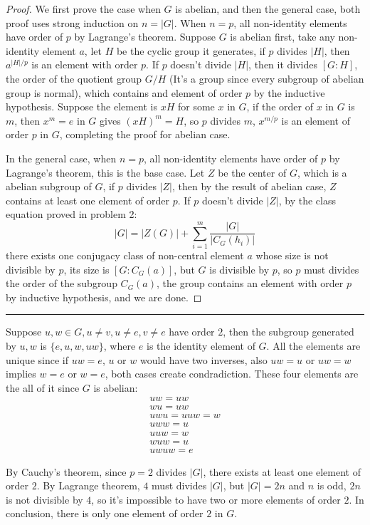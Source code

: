 \documentclass[12pt]{article}
\begin{document}
\begin{proof}
We first prove the case when $G$ is abelian, and then the general case, both proof uses strong induction on $n=|G|$. When $n=p$, all non-identity elements have order of $p$ by Lagrange's theorem. Suppose $G$ is abelian first, take any non-identity element $a$, let $H$ be the cyclic group it generates, if $p$ divides $|H|$, then $a^{|H|/p}$ is an element with order $p$. If $p$ doesn't divide $|H|$, then it divides $[G:H]$, the order of the quotient group $G/H$ (It's a group since every subgroup of abelian group is normal), which contains and element of order $p$ by the inductive hypothesis. Suppose the element is $xH$ for some $x$ in $G$, if the order of $x$ in $G$ is $m$, then $x^m=e$ in $G$ gives $(xH)^m=H$, so $p$ divides $m$, $x^{m/p}$ is an element of order $p$ in $G$, completing the proof for abelian case.

In the general case, when $n=p$, all non-identity elements have order of $p$ by Lagrange's theorem, this is the base case. Let $Z$ be the center of $G$, which is a abelian subgroup of $G$, if $p$ divides $|Z|$, then by the result of abelian case, $Z$ contains at least one element of order $p$. If $p$ doesn't divide $|Z|$, by the class equation proved in problem 2:
$$|G|=|Z(G)|+\displaystyle\sum^m_{i=1}\frac{|G|}{|C_G(h_i)|}$$
there exists one conjugacy class of non-central element $a$ whose size is not divisible by $p$, its size is $[G:C_G(a)]$, but $G$ is divisible by $p$, so $p$ must divides the order of the subgroup $C_G(a)$, the group contains an element with order $p$ by inductive hypothesis, and we are done.
\end{proof}

\noindent\rule{\textwidth}{1pt}

Suppose $u,w\in G,u\ne v,u\ne e,v\ne e$ have order $2$, then the subgroup generated by $u,w$ is $\{e,u,w,uw\}$, where $e$ is the identity element of $G$. All the elements are unique since if $uw=e$, $u$ or $w$ would have two inverses, also $uw=u$ or $uw=w$ implies $w=e$ or $w=e$, both cases create condradiction. These four elements are the all of it since $G$ is abelian:
\begin{align*}
    uw=uw \\
    wu=uw \\
    uwu=uuw=w \\
    uww=u \\
    uuw=w \\
    wuw=u \\
    uwuw=e
\end{align*}

By Cauchy's theorem, since $p=2$ divides $|G|$, there exists at least one element of order $2$. By Lagrange theorem, $4$ must divides $|G|$, but $|G|=2n$ and $n$ is odd, $2n$ is not divisible by $4$, so it's impossible to have two or more elements of order $2$. In conclusion, there is only one element of order $2$ in $G$.
\end{document}
